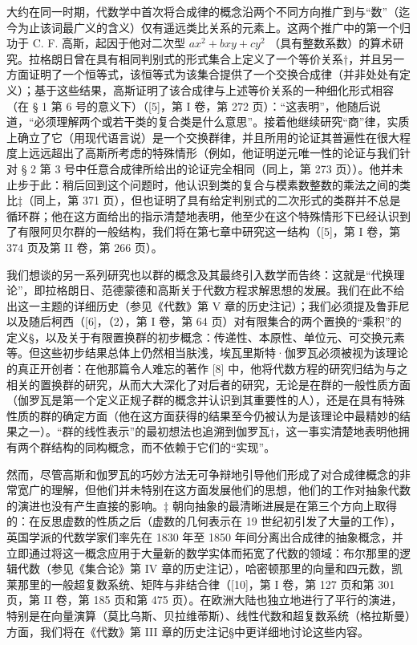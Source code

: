 大约在同一时期，代数学中首次将合成律的概念沿两个不同方向推广到与“数”（迄今为止该词最广义的含义）仅有遥远类比关系的元素上。这两个推广中的第一个归功于 C. F. 高斯，起因于他对二次型 \(ax^{2} + bxy + cy^{2}\) （具有整数系数）的算术研究。拉格朗日曾在具有相同判别式的形式集合上定义了一个等价关系†，并且另一方面证明了一个恒等式，该恒等式为该集合提供了一个交换合成律（并非处处有定义）；基于这些结果，高斯证明了该合成律与上述等价关系的一种细化形式相容（在 § 1 第 6 号的意义下）（{[}5{]}，第 I 卷，第 272 页）：“这表明”，他随后说道，“必须理解两个或若干类的复合类是什么意思”。接着他继续研究“商”律，实质上确立了它（用现代语言说）是一个交换群律，并且所用的论证其普遍性在很大程度上远远超出了高斯所考虑的特殊情形（例如，他证明逆元唯一性的论证与我们针对 § 2 第 3 号中任意合成律所给出的论证完全相同（同上，第 273 页））。他并未止步于此：稍后回到这个问题时，他认识到类的复合与模素数整数的乘法之间的类比‡（同上，第 371 页），但也证明了具有给定判别式的二次形式的类群并不总是循环群；他在这方面给出的指示清楚地表明，他至少在这个特殊情形下已经认识到了有限阿贝尔群的一般结构，我们将在第七章中研究这一结构（{[}5{]}，第 I 卷，第 374 页及第 II 卷，第 266 页）。

我们想谈的另一系列研究也以群的概念及其最终引入数学而告终：这就是“代换理论”，即拉格朗日、范德蒙德和高斯关于代数方程求解思想的发展。我们在此不给出这一主题的详细历史（参见《代数》第 V 章的历史注记）；我们必须提及鲁菲尼以及随后柯西（{[}6{]}，（2），第 I 卷，第 64 页）对有限集合的两个置换的“乘积”的定义§，以及关于有限置换群的初步概念：传递性、本原性、单位元、可交换元素等。但这些初步结果总体上仍然相当肤浅，埃瓦里斯特·伽罗瓦必须被视为该理论的真正开创者：在他那篇令人难忘的著作 {[}8{]} 中，他将代数方程的研究归结为与之相关的置换群的研究，从而大大深化了对后者的研究，无论是在群的一般性质方面（伽罗瓦是第一个定义正规子群的概念并认识到其重要性的人），还是在具有特殊性质的群的确定方面（他在这方面获得的结果至今仍被认为是该理论中最精妙的结果之一）。“群的线性表示”的最初想法也追溯到伽罗瓦†，这一事实清楚地表明他拥有两个群结构的同构概念，而不依赖于它们的“实现”。

然而，尽管高斯和伽罗瓦的巧妙方法无可争辩地引导他们形成了对合成律概念的非常宽广的理解，但他们并未特别在这方面发展他们的思想，他们的工作对抽象代数的演进也没有产生直接的影响。‡ 朝向抽象的最清晰进展是在第三个方向上取得的：在反思虚数的性质之后（虚数的几何表示在 19 世纪初引发了大量的工作），英国学派的代数学家们率先在 1830 年至 1850 年间分离出合成律的抽象概念，并立即通过将这一概念应用于大量新的数学实体而拓宽了代数的领域：布尔那里的逻辑代数（参见《集合论》第 IV 章的历史注记），哈密顿那里的向量和四元数，凯莱那里的一般超复数系统、矩阵与非结合律（{[}10{]}，第 I 卷，第 127 页和第 301 页，第 II 卷，第 185 页和第 475 页）。在欧洲大陆也独立地进行了平行的演进，特别是在向量演算（莫比乌斯、贝拉维蒂斯）、线性代数和超复数系统（格拉斯曼）方面，我们将在《代数》第 III 章的历史注记§中更详细地讨论这些内容。

